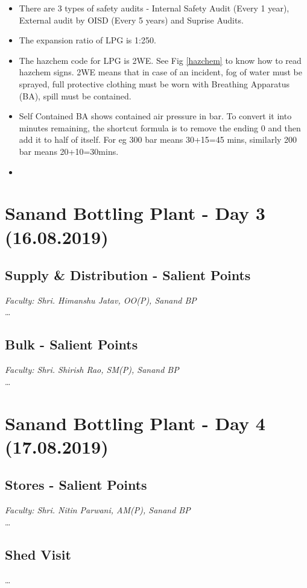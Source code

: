 \documentclass{report}
\begin{document}
\begin{itemize}
		\item There are 3 types of safety audits - Internal Safety Audit (Every 1 year), External audit by OISD (Every 5 years) and Suprise Audits.
		\item The expansion ratio of LPG is 1:250.
		\item The hazchem code for LPG is 2WE. See Fig \ref{hazchem} to know how to read hazchem signs. 2WE means that in case of an incident, fog of water must be sprayed, full protective clothing must be worn with Breathing Apparatus (BA), spill must be contained.
		\item Self Contained BA shows contained air pressure in bar. To convert it into minutes remaining, the shortcut formula is to remove the ending 0 and then add it to half of itself. For eg 300 bar means 30+15=45 mins, similarly 200 bar means 20+10=30mins.
		\item 
	\end{itemize}
	
	\section{Sanand Bottling Plant - Day 3 (16.08.2019)}
	
	\subsection{Supply \& Distribution - Salient Points}
	\textit{Faculty: Shri. Himanshu Jatav, OO(P), Sanand BP}\\
	\ldots
	
	\subsection{Bulk - Salient Points}
	\textit{Faculty: Shri. Shirish Rao, SM(P), Sanand BP}\\
	\ldots
	
	\section{Sanand Bottling Plant - Day 4 (17.08.2019)}
	\subsection{Stores - Salient Points}
	\textit{Faculty: Shri. Nitin Parwani, AM(P), Sanand BP}\\
	\ldots
	
	\subsection{Shed Visit}
	\ldots
	
\end{document}
